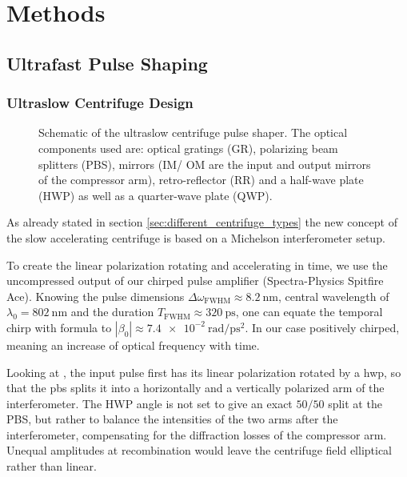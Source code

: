\chapter{Methods}
\label{ch:methods}
\section{Ultrafast Pulse Shaping}
\subsection{Ultraslow Centrifuge Design}
\label{sec:usCFG_design}
\begin{figure}[ht]
    \centering
    
    \caption{Schematic of the ultraslow centrifuge pulse shaper. The optical components used are: optical gratings (GR), polarizing beam splitters (PBS), mirrors (IM/ OM are the input and output mirrors of the compressor arm), retro-reflector (RR) and a half-wave plate (HWP) as well as a quarter-wave plate (QWP).}
    \label{fig:usCFG}
\end{figure}

As already stated in section \ref{sec:different_centrifuge_types} the new concept of the slow accelerating centrifuge is based on a Michelson interferometer setup.

To create the linear polarization rotating and accelerating in time, we use the uncompressed output of our chirped pulse amplifier (Spectra-Physics Spitfire Ace). Knowing the pulse dimensions  $\Delta \omega_{\mathrm{FWHM}} \approx \SI{8.2}{\nano\meter}$, central wavelength of $\lambda_0 = \SI{802}{\nano\meter}$ and the duration $T_{\mathrm{FWHM}} \approx \SI{320}{\pico\second}$, one can equate the temporal chirp with formula  to $\left|\beta_0 \right| \approx \SI{7.4e-2}{\radian\per\pico\second\squared}$. In our case positively chirped, meaning an increase of optical frequency with time. 

Looking at , the input pulse first has its linear polarization rotated by a \gls{hwp}, so that the \gls{pbs} splits it into a horizontally and a vertically polarized arm of the interferometer. The HWP angle is not set to give an exact $50/50$ split at the PBS, but rather to balance the intensities of the two arms after the interferometer, compensating for the diffraction losses of the compressor arm. Unequal amplitudes at recombination would leave the centrifuge field elliptical rather than linear.

